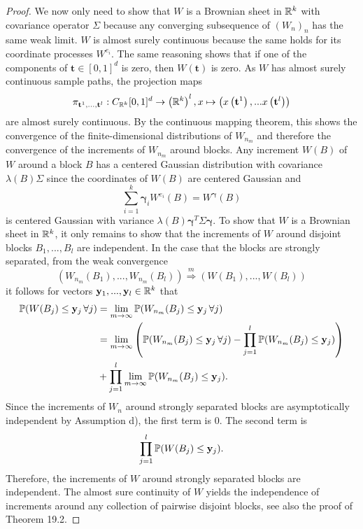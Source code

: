 \begin{proof}
    We now only need to show that $W$ is a Brownian sheet in $\mathbb{R}^k$ with covariance operator $\Sigma$ because any converging subsequence of $(W_n)_n$ has the same weak limit. $W$ is almost surely continuous because the same holds for its coordinate processes $W^{e_i}$. The same reasoning shows that if one of the components of $\mathbf{t} \in [0,1]^d$ is zero, then $W(\mathbf{t})$ is zero.
    As $W$ has almost surely continuous sample paths, the projection maps
    \[ \pi_{\mathbf{t}^1, ..., \mathbf{t}^l}: C_{\mathbb{R}^k}[0,1]^d \to \left(\mathbb{R}^k\right)^l, x \mapsto \left(x\left(\mathbf{t}^1\right), ...x\left(\mathbf{t}^l\right)\right) \]
    are almost surely continuous. By the continuous mapping theorem, this shows the convergence of the finite-dimensional distributions of $W_{n_m}$ and therefore the convergence of the increments of $W_{n_m}$ around blocks.
    Any increment $W(B)$ of $W$ around a block $B$ has a centered Gaussian distribution with covariance $\lambda(B) \Sigma$ since the coordinates of $W(B)$ are centered Gaussian and
    \[ \sum\limits_{i=1}^k {\boldsymbol{\gamma}}_i W^{e_i}(B) = W^{{\boldsymbol{\gamma}}}(B) \]
    is centered Gaussian with variance $\lambda(B) {\boldsymbol{\gamma}}^T \Sigma {\boldsymbol{\gamma}}$. To show that $W$ is a Brownian sheet in $\mathbb{R}^k$, it only remains to show that the increments of $W$ around disjoint blocks $B_1, ..., B_l$ are independent. In the case that the blocks are strongly separated, from the weak convergence
    \[ (W_{n_m}(B_1), ..., W_{n_m}(B_l)) \stackrel{m}{\Rightarrow} (W(B_1), ..., W(B_l))   \]
    it follows for vectors $\mathbf{y}_1, ..., \mathbf{y}_l \in \mathbb{R}^k$ that
    \begin{align*}
        \mathbb{P}(W(B_j) \leq \mathbf{y}_j \, \forall j) 
        & = \lim\limits_{m \to \infty} \mathbb{P}(W_{n_m}(B_j) \leq \mathbf{y}_j \, \forall j) \\
        & = \lim\limits_{m \to \infty} \left( \mathbb{P}(W_{n_m}(B_j) \leq \mathbf{y}_j \, \forall j) - \prod\limits_{j=1}^l \mathbb{P}(W_{n_m}(B_j) \leq \mathbf{y}_j) \right) \\
        & + \prod\limits_{j=1}^l \lim\limits_{m \to \infty} \mathbb{P}(W_{n_m}(B_j) \leq \mathbf{y}_j).
    \end{align*}
    Since the increments of $W_n$ around strongly separated blocks are asymptotically independent by Assumption d), the first term is $0$. The second term is
    \[ \prod_{j=1}^l \mathbb{P}(W(B_j) \leq \mathbf{y}_j). \]
    Therefore, the increments of $W$ around strongly separated blocks are independent. The almost sure continuity of $W$ yields the independence of increments around any collection of pairwise disjoint blocks, see also the proof of \cite{[4]billingsley1968convergence} Theorem 19.2.
\end{proof}

